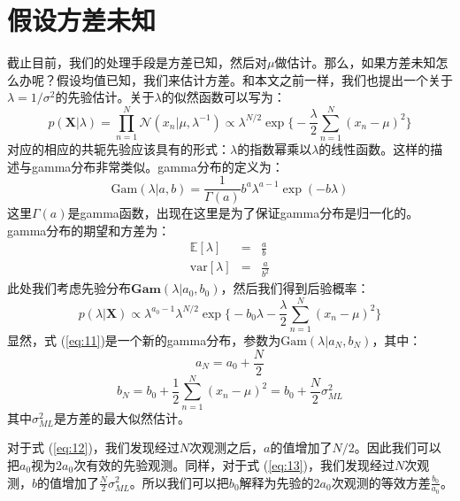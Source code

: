 \documentclass[10pt,a4paper,UTF8]{article}
\begin{document}
\section{假设方差未知}
\label{sec:org9ca01a7}


截止目前，我们的处理手段是方差已知，然后对\(\mu\)做估计。那么，如果方差未知怎么办呢？假设均值已知，我们来估计方差。和本文之前一样，我们也提出一个关于\(\lambda = 1/\sigma^{2}\)的先验估计。关于\(\lambda\)的似然函数可以写为：
\begin{equation}
\label{eq:7}
p(\mathbf{X}|\lambda) = \prod_{n=1}^{N}\mathcal{N}(x_{n}|\mu,\lambda^{-1}) \propto \lambda^{N/2}\exp\bigg\{ -\frac{\lambda}{2} \sum_{n=1}^{N}(x_{n} - \mu)^{2} \bigg\}
\end{equation}
对应的相应的共轭先验应该具有的形式：\(\lambda\)的指数幂乘以\(\lambda\)的线性函数。这样的描述与gamma分布非常类似。gamma分布的定义为：
\begin{equation}
\label{eq:8}
\mathrm{Gam}(\lambda|a,b) = \frac{1}{\Gamma(a)} b^{a}\lambda^{a-1} \exp(-b\lambda)
\end{equation}
这里\(\Gamma(a)\)是gamma函数，出现在这里是为了保证gamma分布是归一化的。gamma分布的期望和方差为：
\begin{eqnarray}
\label{eq:10}
\mathbb{E}[\lambda]&=& \frac{a}{b} \\
\mathrm{var}[\lambda] &=& \frac{a}{b^{2}}
\end{eqnarray}
此处我们考虑先验分布\(\mathbf{Gam}(\lambda|a_{0},b_{0})\)，然后我们得到后验概率：
\begin{equation}
\label{eq:11}
p(\lambda|\mathbf{X}) \propto \lambda^{a_{0}-1}\lambda^{N/2}\exp\bigg\{ -b_{0}\lambda -\frac{\lambda}{2}\sum_{n=1}^{N}(x_{n} - \mu)^{2} \bigg\}
\end{equation}
显然，式 (\ref{eq:11})是一个新的gamma分布，参数为\(\mathrm{Gam}(\lambda | a_{N},b_{N})\)，其中：
\begin{equation}
\label{eq:12}
a_{N} = a_{0} + \frac{N}{2}
\end{equation}
\begin{equation}
\label{eq:13}
b_{N} = b_{0} + \frac{1}{2}\sum_{n=1}^{N}(x_{n} - \mu)^{2} = b_{0} + \frac{N}{2}\sigma_{ML}^{2}
\end{equation}
其中\(\sigma_{ML}^{2}\)是方差的最大似然估计。

对于式 (\ref{eq:12})，我们发现经过\(N\)次观测之后，\(a\)的值增加了\(N/2\)。因此我们可以把\(a_{0}\)视为\(2a_{0}\)次有效的先验观测。同样，对于式 (\ref{eq:13})，我们发现经过\(N\)次观测，\(b\)的值增加了\(\frac{N}{2}\sigma_{ML}^{2}\)。所以我们可以把\(b_{0}\)解释为先验的\(2a_{0}\)次观测的等效方差\(\tfrac{b_{0}}{a_{0}}\)。
\end{document}
